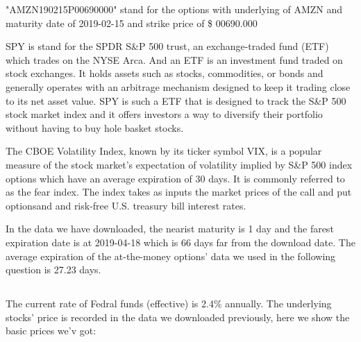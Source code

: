 \documentclass[11pt]{article}
\begin{document}
"AMZN190215P00690000" stand for the options with underlying of AMZN and
maturity date of 2019-02-15 and strike price of \$ 00690.000

SPY is stand for the SPDR S\&P 500 trust, an exchange-traded fund (ETF)
which trades on the NYSE Arca. And an ETF is an investment fund traded
on stock exchanges. It holds assets such as stocks, commodities, or
bonds and generally operates with an arbitrage mechanism designed to
keep it trading close to its net asset value. SPY is such a ETF that is
designed to track the S\&P 500 stock market index and it offers
investors a way to diversify their portfolio without having to buy hole
basket stocks.

The CBOE Volatility Index, known by its ticker symbol VIX, is a popular
measure of the stock market's expectation of volatility implied by S\&P
500 index options which have an average expiration of 30 days. It is
commonly referred to as the fear index. The index takes as inputs the
market prices of the call and put optionsand and risk-free U.S. treasury
bill interest rates.

In the data we have downloaded, the nearist maturity is 1 day and the
farest expiration date is at 2019-04-18 which is 66 days far from the
download date. The average expiration of the at-the-money options' data
we used in the following question is 27.23 days.

    \subsection{}\label{section}

The current rate of Fedral funds (effective) is 2.4\% annually. The
underlying stocks' price is recorded in the data we downloaded
previously, here we show the basic prices we'v got:
\end{document}
